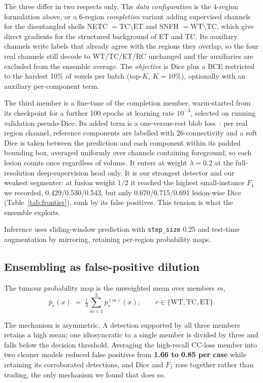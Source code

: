 \documentclass[runningheads]{llncs}
\begin{document}
The three differ in two respects only. The \emph{data configuration} is the 4-region formulation
above, or a 6-region \emph{completion} variant adding supervised channels for the disentangled
shells NETC $=\mathrm{TC}\setminus\mathrm{ET}$ and SNFH $=\mathrm{WT}\setminus\mathrm{TC}$, which
give direct gradients for the structured background of ET and TC. Its auxiliary channels write
labels that already agree with the regions they overlap, so the four real channels still decode
to WT/TC/ET/RC unchanged and the auxiliaries are excluded from the ensemble average. The
\emph{objective} is Dice plus a BCE restricted to the hardest 10\% of voxels per batch
(top-$K$, $K=10\%$), optionally with an auxiliary per-component term.

The third member is a fine-tune of the completion member, warm-started from its checkpoint for a
further 100 epochs at learning rate $10^{-3}$, selected on running validation pseudo-Dice. Its
added term is a one-versus-rest blob loss~\cite{kofler2022blob,kundu2026instance}: per real
region channel, reference components are labelled with 26-connectivity and a soft Dice is taken
between the prediction and each component within its padded bounding box, averaged uniformly over
channels containing foreground, so each lesion counts once regardless of volume. It enters at
weight $\lambda=0.2$ at the full-resolution deep-supervision head only. It is our strongest
detector and our weakest segmenter: at fusion weight $1/2$ it reached the highest small-instance
$F_1$ we recorded, 0.429/0.530/0.543, but only 0.670/0.715/0.691 lesion-wise Dice
(Table~\ref{tab:frontier}), sunk by its false positives. This tension is what the ensemble
exploits.

Inference uses sliding-window prediction with \texttt{step\_size} 0.25 and test-time
augmentation by mirroring, retaining per-region probability maps.

\subsection{Ensembling as false-positive dilution}
\label{sec:ensembling}

The tumour probability map is the unweighted mean over members $m$,
\[
\bar{p}_r(x) \;=\; \tfrac{1}{3}\sum_{m=1}^{3} p_r^{(m)}(x), \qquad
r \in \{\mathrm{WT},\mathrm{TC},\mathrm{ET}\}.
\]

The mechanism is asymmetric. A detection supported by all three members retains a high mean; one
idiosyncratic to a single member is divided by three and falls below the decision threshold.
Averaging the high-recall CC-loss member into two cleaner models reduced false positives from
\textbf{1.66 to 0.85 per case} while retaining its corroborated detections, and Dice and $F_1$
rose together rather than trading, the only mechanism we found that does so.
\end{document}
